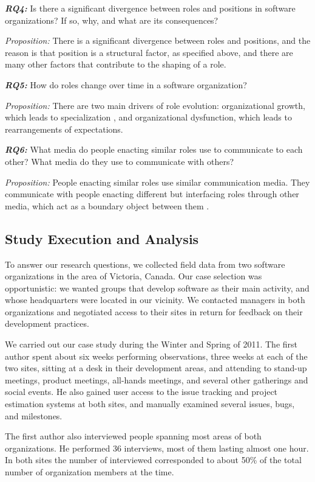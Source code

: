 \documentclass[10pt, conference, compsocconf]{IEEEtran}
\begin{document}
\textbf{\emph{RQ4:}} Is there a significant divergence between roles and positions in software organizations? If so, why, and what are its consequences?

\emph{Proposition:} There is a significant divergence between roles and positions, and the reason is that position is a structural factor, as specified above, and there are many other factors that contribute to the shaping of a role.

\textbf{\emph{RQ5:}} How do roles change over time in a software organization?

\emph{Proposition:} There are two main drivers of role evolution: organizational growth, which leads to specialization \cite{Blau1971,Haveman1993}, and organizational dysfunction, which leads to rearrangements of expectations.

\textbf{\emph{RQ6:}} What media do people enacting similar roles use to communicate to each other? What media do they use to communicate with others?

\emph{Proposition:} People enacting similar roles use similar communication media. They communicate with people enacting different but interfacing roles through other media, which act as a boundary object between them \cite{Bowker1999}.



\subsection{Study Execution and Analysis}

To answer our research questions, we collected field data from two software organizations in the area of Victoria, Canada. Our case selection was opportunistic: we wanted groups that develop software as their main activity, and whose headquarters were located in our vicinity. We contacted managers in both organizations and negotiated access to their sites in return for feedback on their development practices.

We carried out our case study during the Winter and Spring of 2011. The first author spent about six weeks performing observations, three weeks at each of the two sites, sitting at a desk in their development areas, and attending to stand-up meetings, product meetings, all-hands meetings, and several other gatherings and social events. He also gained user access to the issue tracking and project estimation systems at both sites, and manually examined several issues, bugs, and milestones.

The first author also interviewed people spanning most areas of both organizations. He performed 36 interviews, most of them lasting almost one hour. In both sites the number of interviewed corresponded to about 50\% of the total number of organization members at the time.
\end{document}
